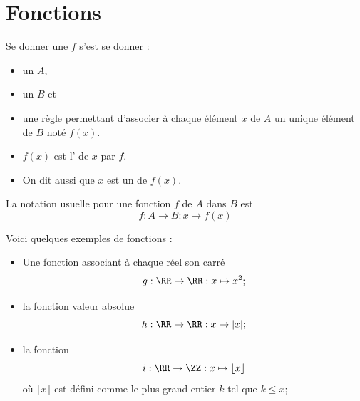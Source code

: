 \section{Fonctions}
\begin{frame}
\begin{definition}
Se donner une  $f$ s'est se donner :
\begin{itemize}
\item un  $A$,
\item un  $B$ et
\item une règle permettant d'associer à chaque élément $x$ de $A$ un unique élément de $B$ noté \(f(x)\).
\end{itemize}

\begin{itemize}
\item \(f(x)\) est l' de $x$ par $f$.
\item On dit aussi que \(x\) est un  de \(f(x)\).
\end{itemize}

La notation usuelle pour une fonction $f$ de $A$ dans $B$ est
\begin{equation*}
  f : A \to B : x \mapsto f(x)
\end{equation*}
\end{definition}
\end{frame}

\begin{frame}
\begin{example}Voici quelques exemples de fonctions :
  \begin{itemize}[<+->]
  \item Une fonction associant à chaque réel son carré
    \begin{equation*}
      g : \RR \to \RR : x \mapsto x^2 ;
    \end{equation*}
  \item la fonction valeur absolue
    \begin{equation*}
      h : \RR \to \RR : x \mapsto |x| ;
    \end{equation*}
  \item la fonction 
    \begin{equation*}
      i : \RR \to \ZZ : x \mapsto \lfloor x \rfloor
    \end{equation*}
    où $\lfloor x \rfloor$ est défini comme le plus grand entier $k$ tel que $k \leqslant x$;
  \end{itemize}
\end{example}
\end{frame}

